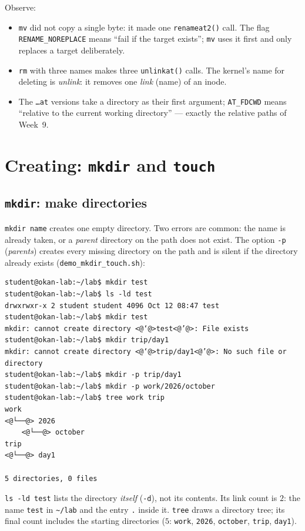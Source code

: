 \documentclass[11pt,a4paper]{article}
\newcommand{\cmd}[1]{\texttt{#1}}
\begin{document}
Observe:
\begin{itemize}
  \item \cmd{mv} did not copy a single byte: it made one \cmd{renameat2()} call. The flag \texttt{RENAME\_NOREPLACE} means ``fail if the target exists''; \cmd{mv} uses it first and only replaces a target deliberately.
  \item \cmd{rm} with three names makes three \cmd{unlinkat()} calls. The kernel's name for deleting is \emph{unlink}: it removes one \emph{link} (name) of an inode.
  \item The \texttt{\dots at} versions take a directory as their first argument; \texttt{AT\_FDCWD} means ``relative to the current working directory'' --- exactly the relative paths of Week~9.
\end{itemize}

\section{Creating: \texttt{mkdir} and \texttt{touch}}

\subsection{\texttt{mkdir}: make directories}

\cmd{mkdir name} creates one empty directory. Two errors are common: the name is already taken, or a \emph{parent} directory on the path does not exist. The option \cmd{-p} (\emph{parents}) creates every missing directory on the path and is silent if the directory already exists (\cmd{demo\_mkdir\_touch.sh}):

\begin{lstlisting}[style=term]
student@okan-lab:~/lab$ mkdir test
student@okan-lab:~/lab$ ls -ld test
drwxrwxr-x 2 student student 4096 Oct 12 08:47 test
student@okan-lab:~/lab$ mkdir test
mkdir: cannot create directory <@‘@>test<@’@>: File exists
student@okan-lab:~/lab$ mkdir trip/day1
mkdir: cannot create directory <@‘@>trip/day1<@’@>: No such file or directory
student@okan-lab:~/lab$ mkdir -p trip/day1
student@okan-lab:~/lab$ mkdir -p work/2026/october
student@okan-lab:~/lab$ tree work trip
work
<@└──@> 2026
    <@└──@> october
trip
<@└──@> day1

5 directories, 0 files
\end{lstlisting}

\cmd{ls -ld test} lists the directory \emph{itself} (\cmd{-d}), not its contents. Its link count is $2$: the name \texttt{test} in \texttt{\textasciitilde/lab} and the entry \texttt{.} inside it. \cmd{tree} draws a directory tree; its final count includes the starting directories ($5$: \texttt{work}, \texttt{2026}, \texttt{october}, \texttt{trip}, \texttt{day1}).
\end{document}
